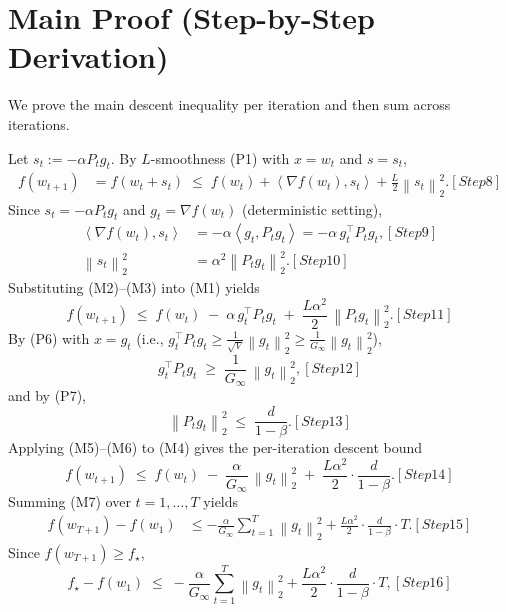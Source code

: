 \documentclass[11pt]{article}
\newcommand{\norm}[1]{\left\lVert #1 \right\rVert}
\newcommand{\ip}[2]{\left\langle #1, #2 \right\rangle}
\begin{document}
\section*{Main Proof (Step-by-Step Derivation)}
We prove the main descent inequality per iteration and then sum across iterations.

Let $s_t := -\alpha P_t g_t$. By $L$-smoothness (P1) with $x=w_t$ and $s=s_t$,
\begin{align}
f(w_{t+1})
&= f(w_t + s_t)
\;\le\;
f(w_t) + \ip{\nabla f(w_t)}{s_t} + \frac{L}{2}\norm{s_t}_2^2.
\tag{M1}[Step 8]
\end{align}
Since $s_t=-\alpha P_t g_t$ and $g_t=\nabla f(w_t)$ (deterministic setting),
\begin{align}
\ip{\nabla f(w_t)}{s_t}
&= -\alpha \ip{g_t}{P_t g_t}
= -\alpha\, g_t^\top P_t g_t,
\tag{M2}[Step 9]
\\
\norm{s_t}_2^2
&= \alpha^2 \norm{P_t g_t}_2^2.
\tag{M3}[Step 10]
\end{align}
Substituting (M2)–(M3) into (M1) yields
\begin{equation}
f(w_{t+1})
\;\le\;
f(w_t)
\;-\;\alpha\, g_t^\top P_t g_t
\;+\;\frac{L\alpha^2}{2}\,\norm{P_t g_t}_2^2.
\tag{M4}[Step 11]
\end{equation}
By (P6) with $x=g_t$ (i.e., $g_t^\top P_t g_t \ge \frac{1}{\sqrt{V}}\norm{g_t}_2^2 \ge \frac{1}{G_\infty}\norm{g_t}_2^2$),
\begin{equation}
g_t^\top P_t g_t \;\ge\; \frac{1}{G_\infty}\,\norm{g_t}_2^2,
\tag{M5}[Step 12]
\end{equation}
and by (P7),
\begin{equation}
\norm{P_t g_t}_2^2 \;\le\; \frac{d}{1-\beta}.
\tag{M6}[Step 13]
\end{equation}
Applying (M5)–(M6) to (M4) gives the per-iteration descent bound
\begin{equation}
f(w_{t+1})
\;\le\;
f(w_t)
\;-\;\frac{\alpha}{G_\infty}\,\norm{g_t}_2^2
\;+\;\frac{L\alpha^2}{2}\cdot \frac{d}{1-\beta}.
\tag{M7}[Step 14]
\end{equation}
Summing (M7) over $t=1,\dots,T$ yields
\begin{align}
f(w_{T+1}) - f(w_1)
&\le
-\frac{\alpha}{G_\infty}\sum_{t=1}^T \norm{g_t}_2^2
+ \frac{L\alpha^2}{2}\cdot \frac{d}{1-\beta}\cdot T.
\tag{M8}[Step 15]
\end{align}
Since $f(w_{T+1})\ge f_\star$,
\begin{equation}
f_\star - f(w_1)
\;\le\;
-\frac{\alpha}{G_\infty}\sum_{t=1}^T \norm{g_t}_2^2
+ \frac{L\alpha^2}{2}\cdot \frac{d}{1-\beta}\cdot T,
\tag{M9}[Step 16]
\end{equation}
\end{document}
